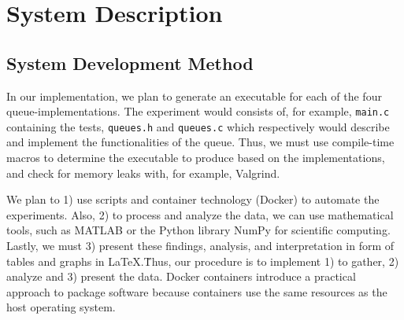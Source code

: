 \documentclass[a4paper,11pt]{kth-mag}
\newcommand*{\skippara}{\par\vspace{\baselineskip} \noindent}
\begin{document}
\clearpage


\section{System Description}\label{section:system}


\subsection{System Development Method}
In our implementation, we plan to generate an executable for each of the four queue-implementations.
The experiment would consists of, for example, \texttt{main.c} containing the tests, \texttt{queues.h} and \texttt{queues.c} which respectively would describe and implement the functionalities of the queue.
Thus, we must use compile-time macros to determine the executable to produce based on the implementations, and check for memory leaks with, for example, Valgrind.

\skippara We plan to 1) use scripts and container technology (Docker) to automate the experiments.
Also, 2) to process and analyze the data, we can use mathematical tools, such as MATLAB or the Python library NumPy for scientific computing.
Lastly, we must 3) present these findings, analysis, and interpretation in form of tables and graphs in \LaTeX.\.
Thus, our procedure is to implement 1) to gather, 2) analyze and 3) present the data.
Docker containers introduce a practical approach to package software because containers use the same resources as the host operating system.
\end{document}
